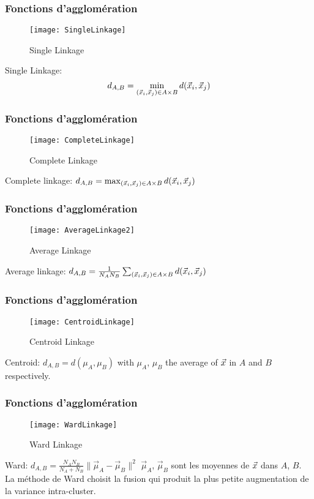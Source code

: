\begin{frame}
\frametitle{Fonctions d'agglomération}
\begin{figure}[htb]
  \centering
  \texttt{[image: SingleLinkage]}
  \caption{Single Linkage}
\end{figure}
Single Linkage: 
\begin{equation*}
d_{A,B} = \min_{(\vec{x}_i,\vec{x}_j) \in A \times B}{d(\vec{x}_i, \vec{x}_j)}
\end{equation*}

\end{frame}


\begin{frame}
\frametitle{Fonctions d'agglomération}
\begin{figure}[htb]
  \centering
  \texttt{[image: CompleteLinkage]}
  \caption{Complete Linkage}
\end{figure}
Complete linkage: $d_{A,B} = \max_{(\vec{x}_i, \vec{x}_j) \in A \times B}{d(\vec{x}_i, \vec{x}_j)}$
\end{frame}


\begin{frame}
\frametitle{Fonctions d'agglomération}

\begin{figure}[htb]
  \centering
  \texttt{[image: AverageLinkage2]}
  \caption{Average Linkage}
\end{figure}
Average linkage: $d_{A,B} = \frac{1}{N_AN_B} \sum_{(\vec{x}_i, \vec{x}_j) \in A \times B} d(\vec{x}_i, \vec{x}_j)$
\end{frame}



\begin{frame}
\frametitle{Fonctions d'agglomération}

\begin{figure}[htb]
  \centering
  \texttt{[image: CentroidLinkage]}
  \caption{Centroid Linkage}
\end{figure}
Centroid: $d_{A,B} = d(\mu_A, \mu_B)$ with $\mu_A$, $\mu_B$ the average of $\vec{x}$ in $A$ and $B$ respectively.  
\end{frame}


\begin{frame}
\frametitle{Fonctions d'agglomération}
\begin{figure}[htb]
  \centering
  \texttt{[image: WardLinkage]}
  \caption{Ward Linkage}
\end{figure}
Ward: $d_{A,B} = \frac{N_AN_B}{N_A+N_B}\|\overrightarrow{\mu}_A - \overrightarrow{\mu}_B\|^2$
$\overrightarrow{\mu}_A$, $\overrightarrow{\mu}_B$ sont les moyennes de $\vec{x}$ dans $A$, $B$. La méthode de Ward choisit la fusion qui produit la plus petite augmentation de la variance intra-cluster. 
\end{frame}

